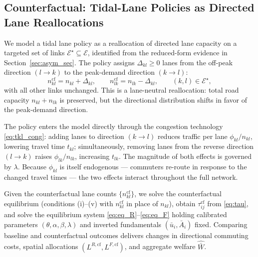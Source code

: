 \documentclass[12pt]{article}
\begin{document}

	\subsection{Counterfactual: Tidal-Lane Policies as Directed Lane Reallocations}

	We model a tidal lane policy as a reallocation of directed lane capacity on a targeted set of links $\mathcal{E}^\star\subseteq\mathcal{E}$, identified from the reduced-form evidence in Section~\ref{sec:asym_sec}. The policy assigns $\Delta_{kl}\geq 0$ lanes from the off-peak direction $(l\to k)$ to the peak-demand direction $(k\to l)$:
	\begin{equation}\label{eq:cf_lanes}
		n_{kl}^{\mathrm{cf}} = n_{kl} + \Delta_{kl},
		\qquad
		n_{lk}^{\mathrm{cf}} = n_{lk} - \Delta_{kl},
		\qquad (k,l)\in\mathcal{E}^\star,
	\end{equation}
	with all other links unchanged. This is a lane-neutral reallocation: total road capacity $n_{kl}+n_{lk}$ is preserved, but the directional distribution shifts in favor of the peak-demand direction.

	The policy enters the model directly through the congestion technology \eqref{eq:tkl_cong}: adding lanes to direction $(k\to l)$ reduces traffic per lane $\phi_{kl}/n_{kl}$, lowering travel time $t_{kl}$; simultaneously, removing lanes from the reverse direction $(l\to k)$ raises $\phi_{lk}/n_{lk}$, increasing $t_{lk}$. The magnitude of both effects is governed by $\lambda$. Because $\phi_{kl}$ is itself endogenous --- commuters re-route in response to the changed travel times --- the two effects interact throughout the full network.

	Given the counterfactual lane counts $\{n_{kl}^{\mathrm{cf}}\}$, we solve the counterfactual equilibrium (conditions (i)--(v) with $n_{kl}^{\mathrm{cf}}$ in place of $n_{kl}$), obtain $\tau_{ij}^{\mathrm{cf}}$ from \eqref{eq:tau}, and solve the equilibrium system \eqref{eq:eq_R}--\eqref{eq:eq_F} holding calibrated parameters $(\theta,\alpha,\beta,\lambda)$ and inverted fundamentals $(\bar{u}_i,\bar{A}_i)$ fixed. Comparing baseline and counterfactual outcomes delivers changes in directional commuting costs, spatial allocations $(L^{R,\mathrm{cf}},L^{F,\mathrm{cf}})$, and aggregate welfare $\hat{\bar{W}}$.
\end{document}
